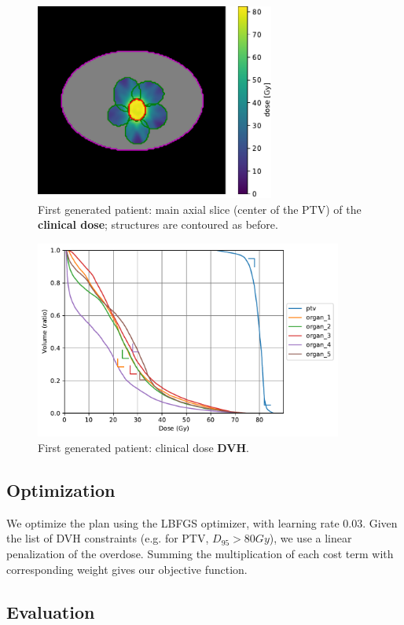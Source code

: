 \begin{figure}
	\centering
	\includegraphics[width=0.7\textwidth]{main_slice-dose.pdf}
	\caption{First generated patient: main axial slice (center of the PTV) of the \textbf{clinical dose}; structures are contoured as before.}
	\label{fig:main_slice-dose}
\end{figure}
\begin{figure}
	\centering
	\includegraphics[width=0.9\textwidth]{dvh_example.pdf}
	\caption{First generated patient: clinical dose \textbf{DVH}.}
	\label{fig:clinical_dvh}
\end{figure}

\subsection*{Optimization}
We optimize the plan using the LBFGS optimizer, with learning rate $0.03$.
Given the list of DVH constraints (e.g. for PTV, $D_{95}>80Gy$), we use a linear penalization of the overdose.
Summing the multiplication of each cost term with corresponding weight gives our objective function.

\subsection*{Evaluation}

